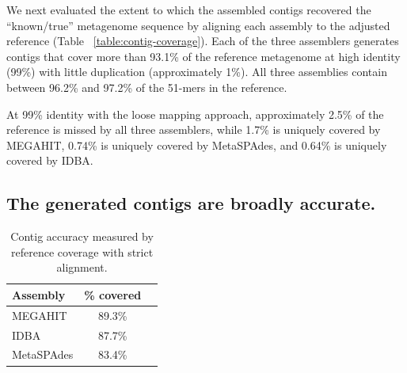 \documentclass[11pt]{article}
\begin{document}
We next evaluated the extent to which the assembled contigs recovered the
``known/true'' metagenome sequence by aligning each assembly to the
adjusted reference (Table ~\ref{table:contig-coverage}).  Each of the three
assemblers generates contigs that cover more than 93.1\% of the reference
metagenome at high identity (99\%) with little duplication
(approximately 1\%).  All three assemblies contain between 96.2\% and 97.2\% of
the 51-mers in the reference.

At 99\% identity with the loose mapping approach, approximately 2.5\%
of the reference is missed by all three assemblers, while 1.7\% is
uniquely covered by MEGAHIT, 0.74\% is uniquely covered by MetaSPAdes, and
0.64\% is uniquely covered by IDBA.



\subsection*{The generated contigs are broadly accurate.} 



\begin{table}[!h]
\centering
\caption{Contig accuracy measured by reference coverage with strict alignment.}
\begin{tabular}{|l|c|c|}\hline
\textbf{Assembly} & \textbf {\% covered}
  \\ \hline
MEGAHIT & 89.3\% \\ \hline
IDBA & 87.7\% \\ \hline
MetaSPAdes &  83.4\% \\ \hline
\end{tabular}
\label{table:contig-accuracy}
\end{table}
\end{document}

